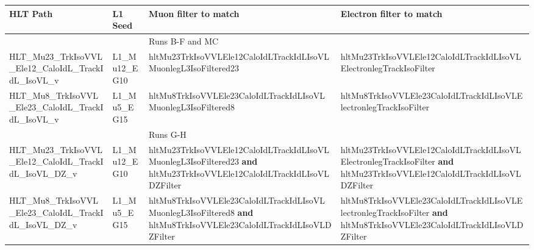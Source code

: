 {\footnotesize
\begin{tabular}{|p{2.5cm} p{2.5cm} p{4.5cm} p{4.5cm}|}
\hline
HLT Path & L1 Seed & Muon filter to match & Electron filter to match \\
\hline
&
&
Runs B-F and MC
&
\\
HLT\_Mu23\_TrkIsoVVL\_Ele12\_CaloIdL\_TrackIdL\_IsoVL\_v
&
L1\_Mu12\_EG10
&
hltMu23TrkIsoVVLEle12CaloIdLTrackIdLIsoVLMuonlegL3IsoFiltered23
&
hltMu23TrkIsoVVLEle12CaloIdLTrackIdLIsoVLElectronlegTrackIsoFilter
\\
HLT\_Mu8\_TrkIsoVVL\_Ele23\_CaloIdL\_TrackIdL\_IsoVL\_v
&
L1\_Mu5\_EG15
&
hltMu8TrkIsoVVLEle23CaloIdLTrackIdLIsoVLMuonlegL3IsoFiltered8
&
hltMu8TrkIsoVVLEle23CaloIdLTrackIdLIsoVLElectronlegTrackIsoFilter \\
\hline
&
&
Runs G-H
&
\\
HLT\_Mu23\_TrkIsoVVL\_Ele12\_CaloIdL\_TrackIdL\_IsoVL\_DZ\_v
&
L1\_Mu12\_EG10
&
hltMu23TrkIsoVVLEle12CaloIdLTrackIdLIsoVLMuonlegL3IsoFiltered23 \textbf{and} hltMu23TrkIsoVVLEle12CaloIdLTrackIdLIsoVLDZFilter
&
hltMu23TrkIsoVVLEle12CaloIdLTrackIdLIsoVLElectronlegTrackIsoFilter \textbf{and} hltMu23TrkIsoVVLEle12CaloIdLTrackIdLIsoVLDZFilter
\\
HLT\_Mu8\_TrkIsoVVL\_Ele23\_CaloIdL\_TrackIdL\_IsoVL\_DZ\_v
&
L1\_Mu5\_EG15
&
hltMu8TrkIsoVVLEle23CaloIdLTrackIdLIsoVLMuonlegL3IsoFiltered8 \textbf{and} hltMu8TrkIsoVVLEle23CaloIdLTrackIdLIsoVLDZFilter
&
hltMu8TrkIsoVVLEle23CaloIdLTrackIdLIsoVLElectronlegTrackIsoFilter \textbf{and} hltMu8TrkIsoVVLEle23CaloIdLTrackIdLIsoVLDZFilter
\\
\hline
\end{tabular}
}